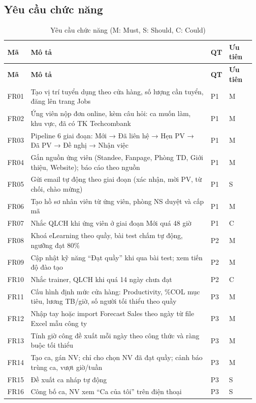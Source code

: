 \documentclass[12pt,a4paper,oneside]{report}
\begin{document}
\subsection{Yêu cầu chức năng}
\begin{longtable}{C{1.1cm}L{9.4cm}C{1cm}C{1.6cm}}
\caption{Yêu cầu chức năng (M: Must, S: Should, C: Could)}\label{tab:fr}\\
\toprule \textbf{Mã} & \textbf{Mô tả} & \textbf{QT} & \textbf{Ưu tiên} \\\midrule\endfirsthead
\toprule \textbf{Mã} & \textbf{Mô tả} & \textbf{QT} & \textbf{Ưu tiên} \\\midrule\endhead
FR01 & Tạo vị trí tuyển dụng theo cửa hàng, số lượng cần tuyển, đăng lên trang Jobs & P1 & M \\
FR02 & Ứng viên nộp đơn online, kèm câu hỏi: ca muốn làm, khu vực, đã có TK Techcombank & P1 & M \\
FR03 & Pipeline 6 giai đoạn: Mới → Đã liên hệ → Hẹn PV → Đã PV → Đề nghị → Nhận việc & P1 & M \\
FR04 & Gắn nguồn ứng viên (Standee, Fanpage, Phòng TD, Giới thiệu, Website); báo cáo theo nguồn & P1 & M \\
FR05 & Gửi email tự động theo giai đoạn (xác nhận, mời PV, từ chối, chào mừng) & P1 & S \\
FR06 & Tạo hồ sơ nhân viên từ ứng viên, phòng NS duyệt và cấp mã & P1 & M \\
FR07 & Nhắc QLCH khi ứng viên ở giai đoạn Mới quá 48 giờ & P1 & C \\
FR08 & Khoá eLearning theo quầy, bài test chấm tự động, ngưỡng đạt 80\% & P2 & M \\
FR09 & Cập nhật kỹ năng ``Đạt quầy'' khi qua bài test; xem tiến độ đào tạo & P2 & M \\
FR10 & Nhắc trainer, QLCH khi quá 14 ngày chưa đạt & P2 & C \\
FR11 & Cấu hình định mức cửa hàng: Productivity, \%COL mục tiêu, lương TB/giờ, số người tối thiểu theo quầy & P3 & M \\
FR12 & Nhập tay hoặc import Forecast Sales theo ngày từ file Excel mẫu công ty & P3 & M \\
FR13 & Tính giờ công đề xuất mỗi ngày theo công thức và ràng buộc tối thiểu & P3 & M \\
FR14 & Tạo ca, gán NV; chỉ cho chọn NV đã đạt quầy; cảnh báo trùng ca, vượt giờ/tuần & P3 & M \\
FR15 & Đề xuất ca nháp tự động & P3 & S \\
FR16 & Công bố ca, NV xem ``Ca của tôi'' trên điện thoại & P3 & S \\

\end{longtable}
\end{document}
